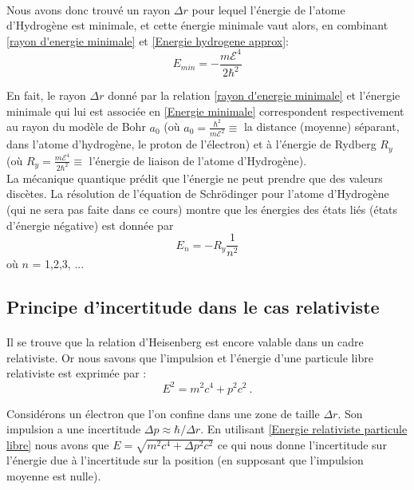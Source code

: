 \documentclass{book}
\begin{document}
\paragraph{} Nous avons donc trouvé un rayon $\Delta r$ pour lequel l'énergie de l'atome d'Hydrogène est minimale, et cette énergie minimale vaut alors, en combinant \ref{rayon d'energie minimale} et \ref{Energie hydrogene approx}: \begin{equation}
    \label{Energie minimale}
    E_{min} = - \frac{m\mathcal{E}^4}{2 \hbar^2}
\end{equation}

En fait, le rayon $\Delta r$ donné par la relation \ref{rayon d'energie minimale} et l'énergie minimale qui lui est associée en \ref{Energie minimale} correspondent respectivement au rayon du modèle de Bohr $a_0$ (où $a_0 = \frac{\hbar^2}{m\mathcal{E}^2} \equiv$ la distance (moyenne) séparant, dans l'atome d'hydrogène, le proton de l'électron) et à l'énergie de Rydberg $R_y$ (où $R_y = \frac{m\mathcal{E}^4}{2\hbar^2} \equiv$ l'énergie de liaison de l'atome d'Hydrogène). \\

La mécanique quantique prédit que l'énergie ne peut prendre que des valeurs discètes. La résolution de l'équation de Schrödinger pour l'atome d'Hydrogène (qui ne sera pas faite dans ce cours) montre que les énergies des états liés (états d'énergie négative) est donnée par 
\begin{equation}
\label{Etats liés}
E_n = - R_y \frac{1}{n^2}
\end{equation}
où $n$ = 1,2,3, ...




\subsection{Principe d'incertitude dans le cas relativiste}
\label{Principe incertitude relativiste}
\paragraph{} Il se trouve que la relation d'Heisenberg est encore valable dans un cadre relativiste. Or nous savons que  l'impulsion et l'énergie d'une particule libre relativiste est exprimée par : 
\begin{equation}
    \label{Energie relativiste particule libre}
    E^2 = m^2 c^4 + p^2 c^2\ .
\end{equation}

Considérons un électron que l'on confine dans une zone de taille $\Delta r$.
Son impulsion a une incertitude $\Delta p \approx \hbar / \Delta r$.
En utilisant
\eqref{Energie relativiste particule libre} nous avons que
$E = \sqrt{ m^2 c^4 + \Delta p^2 c^2}$ ce qui nous donne l'incertitude sur l'énergie due à l'incertitude sur la position (en supposant que l'impulsion moyenne est nulle).
\end{document}

